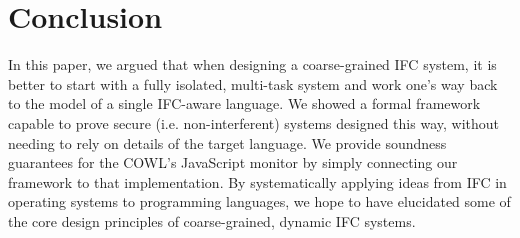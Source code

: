 \section{Conclusion}
\label{sec:conclusion}

In this paper, we argued that when designing a coarse-grained IFC
system, it is better to start with a fully isolated, multi-task system
and work one's way back to the model of a single IFC-aware language.  We showed
a formal framework capable to prove secure (i.e. non-interferent) systems designed this way,
without needing to rely on details of the target language.
We provide soundness guarantees for the COWL's JavaScript monitor by simply
connecting our framework to that implementation.
By systematically applying ideas from IFC in operating systems to programming languages,
we hope to have elucidated some of the core design principles of coarse-grained,
dynamic IFC systems.



